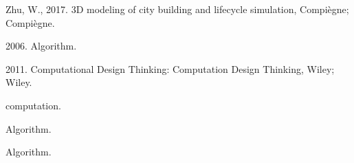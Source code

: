 \documentclass[12pt,turkish,a4paperpaper,]{report}
\begin{document}
\leavevmode\hypertarget{ref-Zhu:2017vm}{}%
Zhu, W., 2017. 3D modeling of city building and lifecycle simulation,
Compiègne; Compiègne.

\leavevmode\hypertarget{ref-Brittanica:2006tb}{}%
2006. Algorithm.

\leavevmode\hypertarget{ref-Menges:2011tm}{}%
2011. Computational Design Thinking: Computation Design Thinking, Wiley;
Wiley.

\leavevmode\hypertarget{ref-Anonymous:rwSizyaB}{}%
computation.

\leavevmode\hypertarget{ref-Anonymous:15wfbqHt}{}%
Algorithm.

\leavevmode\hypertarget{ref-Anonymous:RePk8dlh}{}%
Algorithm.
\end{document}
